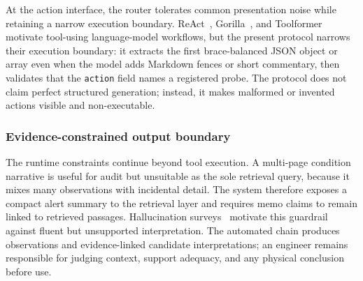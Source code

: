 At the action interface, the router tolerates common presentation noise while retaining a narrow execution boundary. ReAct~\citep{yao2023react}, Gorilla~\citep{patil2024gorilla}, and Toolformer~\citep{schick2023toolformer} motivate tool-using language-model workflows, but the present protocol narrows their execution boundary: it extracts the first brace-balanced JSON object or array even when the model adds Markdown fences or short commentary, then validates that the \texttt{action} field names a registered probe. The protocol does not claim perfect structured generation; instead, it makes malformed or invented actions visible and non-executable.

\subsubsection{Evidence-constrained output boundary}
The runtime constraints continue beyond tool execution. A multi-page condition narrative is useful for audit but unsuitable as the sole retrieval query, because it mixes many observations with incidental detail. The system therefore exposes a compact alert summary to the retrieval layer and requires memo claims to remain linked to retrieved passages. Hallucination surveys~\citep{ji2023hallucination} motivate this guardrail against fluent but unsupported interpretation. The automated chain produces observations and evidence-linked candidate interpretations; an engineer remains responsible for judging context, support adequacy, and any physical conclusion before use.
